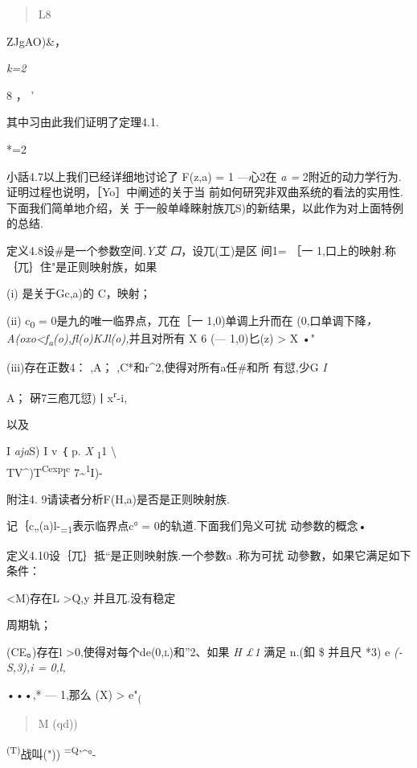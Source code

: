 \begin{quote}
L8
\end{quote}

ZJgAO)\&，

\emph{k=2}

8 ， '

其中习由此我们证明了定理4.1. \textbar{}

*=2

小話4.7以上我们已经详细地讨论了 F(z,a) = 1 ---心2在 \emph{a =}
2附近的动力学行为.证明过程也说明，［Yo］中阐述的关于当
前如何研究非双曲系统的看法的实用性.下面我们简单地介绍，关
于一般单峰睞射族兀S)的新结果，以此作为对上面特例的总结.

定义4.8设\#是一个参数空间\emph{.Y艾 口}，设兀(工)是区 间1= ［一
1,口上的映射.称｛兀｝住"是正则映射族，如果

(i) 是关于Gc,a)的 C，映射；

(ii) c\textsubscript{0} = 0是九的唯一临界点，兀在［一 1,0)单调上升而在
(0,口单调下降\emph{，A(oxo\textless{}f\textsubscript{a}(o),fl(o)KJl(o),}并且对所有
X 6 (--- 1,0)匕(z) \textgreater{} X\textbar{} •"

(iii)存在正数4： ,A； ,C*和r\^{}2,使得对所有a任\#和所 有愆,少G \emph{I}

A； \textbar{}硏7三庖兀愆)丨\textbar{}x\textbar{}\textsuperscript{r}-i,

以及

I \emph{aja}S) I v ｛ p. \emph{X} \textsubscript{1}1 \textbackslash{}\\
TV\^{})T\textsuperscript{Cexp}l\textsuperscript{c}
7\textasciitilde{}\textsuperscript{1}I)-

附注4. 9请读者分析F(H,a)是否是正则映射族.

记｛c„(a)l-\textsubscript{=1}表示临界点c° = 0的轨道.下面我们凫义可扰
动参数的概念•

定义4.10设｛兀｝抵``是正则映射族.一个参数a .称为可扰
动參數，如果它满足如下条件：

\textless{}M)存在L \textgreater{}Q,y 并且兀.没有稳定

周期轨；

(CE。)存在l \textgreater{}0,使得对每个de\textsc{(0,l)}和''2、如果
\emph{H £1} 满足 n.(釦 \$ 并且尺 *3) e \emph{(-S,3),i = 0,l,}

•••,* --- 1,那么 (X)\textbar{} \textgreater{} e"\textsubscript{(}

\begin{quote}
M (qd))
\end{quote}

\textsuperscript{(T)}战叫(")) \textsuperscript{=Q}'\^{}°-

